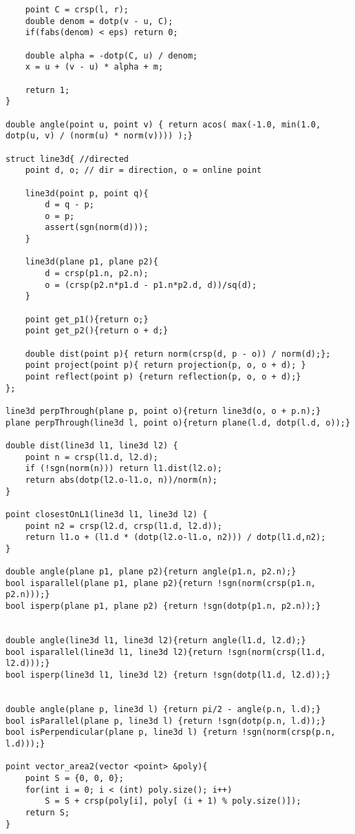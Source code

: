 \documentclass[10pt,a4paper,onesided]{article}
\begin{document}
\begin{multicols*}{3}
\begin{lstlisting}
    point C = crsp(l, r);
    double denom = dotp(v - u, C);
    if(fabs(denom) < eps) return 0;

    double alpha = -dotp(C, u) / denom;
    x = u + (v - u) * alpha + m;

    return 1;
}

double angle(point u, point v) { return acos( max(-1.0, min(1.0, dotp(u, v) / (norm(u) * norm(v)))) );}

struct line3d{ //directed
    point d, o; // dir = direction, o = online point

    line3d(point p, point q){
        d = q - p;
        o = p;
        assert(sgn(norm(d)));
    }

    line3d(plane p1, plane p2){
        d = crsp(p1.n, p2.n);
        o = (crsp(p2.n*p1.d - p1.n*p2.d, d))/sq(d);
    }

    point get_p1(){return o;}
    point get_p2(){return o + d;}

    double dist(point p){ return norm(crsp(d, p - o)) / norm(d);};
    point project(point p){ return projection(p, o, o + d); }
    point reflect(point p) {return reflection(p, o, o + d);}
};

line3d perpThrough(plane p, point o){return line3d(o, o + p.n);}
plane perpThrough(line3d l, point o){return plane(l.d, dotp(l.d, o));}

double dist(line3d l1, line3d l2) {
    point n = crsp(l1.d, l2.d);
    if (!sgn(norm(n))) return l1.dist(l2.o);
    return abs(dotp(l2.o-l1.o, n))/norm(n);
}

point closestOnL1(line3d l1, line3d l2) {
    point n2 = crsp(l2.d, crsp(l1.d, l2.d));
    return l1.o + (l1.d * (dotp(l2.o-l1.o, n2))) / dotp(l1.d,n2);
}

double angle(plane p1, plane p2){return angle(p1.n, p2.n);}
bool isparallel(plane p1, plane p2){return !sgn(norm(crsp(p1.n, p2.n)));}
bool isperp(plane p1, plane p2) {return !sgn(dotp(p1.n, p2.n));}


double angle(line3d l1, line3d l2){return angle(l1.d, l2.d);}
bool isparallel(line3d l1, line3d l2){return !sgn(norm(crsp(l1.d, l2.d)));}
bool isperp(line3d l1, line3d l2) {return !sgn(dotp(l1.d, l2.d));}


double angle(plane p, line3d l) {return pi/2 - angle(p.n, l.d);}
bool isParallel(plane p, line3d l) {return !sgn(dotp(p.n, l.d));}
bool isPerpendicular(plane p, line3d l) {return !sgn(norm(crsp(p.n, l.d)));}

point vector_area2(vector <point> &poly){
    point S = {0, 0, 0};
    for(int i = 0; i < (int) poly.size(); i++)
        S = S + crsp(poly[i], poly[ (i + 1) % poly.size()]);
    return S;
}


\end{lstlisting}
\end{multicols*}
\end{document}
